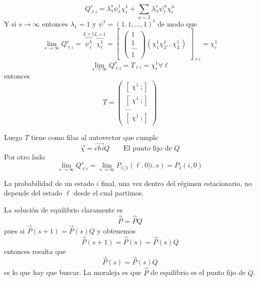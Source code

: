 \documentclass[10pt,oneside]{CBFT_book}
\begin{document}
\[
	Q_{\ell i}^s = \lambda_1^s \psi_\ell^1 \chi_i^1 + 
	\sum_{\alpha=2} \lambda_\alpha^s \psi_\ell^\alpha \chi_i^\alpha
\]
Y si $s \to \infty$ entonces $\lambda_1 = 1$ y $\psi^1 = (1,1,...,1)^t$ de modo que 
\[
	\lim_{s\to \infty} Q^s_{\ell i} = \overbrace{\psi_\ell^1}^{L\times 1} 
	\overbrace{\chi_\ell^1}^{L\times 1} = \begin{bmatrix}
	                                       \begin{pmatrix}
	                                        1 \\
	                                        1 \\ 
	                                        ... \\
	                                        1
	                                       \end{pmatrix}
						(\chi_1^1 \chi_2^1 ... \chi_L^1 )
	                                      \end{bmatrix}_{\ell i}
	= \chi_i^1
\]
\[
	\lim_{s\to \infty} Q^s_{\ell i} = T_{\ell i} = \chi_i^1 \forall \ell
\]
entonces
\[
	T = \begin{pmatrix}
	     [ \; \chi^1 \ ; ] \\
	     [ \; \chi^1 \ ; ] \\
	     ...\\
	     [ \; \chi^1 \ ; ]
	    \end{pmatrix}
\]

Luego $T$ tiene como filas al autovector que cumple
\[
	\vec{\chi} = \vec{chi} Q \qquad \text{El punto fijo de $Q$}
\]
Por otro lado
\[
	\lim_{s\to \infty} Q^s_{\ell i} = \lim_{s\to \infty} P_{1/1}(\ell, 0 | i,s) = P_1(i,0)
\]

La probabilidad de un estado $i$ final, una vez dentro del régimen estacionario, no depende del estado
$\ell$ desde el cual partimos.

La solución de equilibrio claramente es
\[
	\vec{P} = \vec{P} Q 
\]
pues si $\vec{P}(s+1) = \vec{P}(s)Q$ y obtenemos
\[
	\vec{P}(s+1) = \vec{P}(s) = \vec{P}(s)Q
\]
entonces resulta que 
\[
	\vec{P}(s)  = \vec{P}(s) Q
\]
es lo que hay que buscar.
La moraleja es que $\vec{P}$ de equilibrio es el punto fijo de $Q$.




\end{document}
